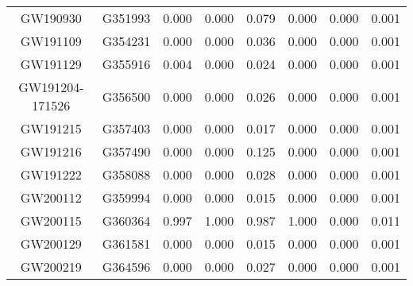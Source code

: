 \begin{table}[]
\begin{tabular}{c|c|ccr|ccr}
GW190930                      & G351993               & 0.000                   & 0.000                    & 0.079                   & 0.000                   & 0.000                    & 0.001                   \\
GW191109                      & G354231               & 0.000                   & 0.000                    & 0.036                   & 0.000                   & 0.000                    & 0.001                   \\
GW191129                      & G355916               & 0.004                   & 0.000                    & 0.024                   & 0.000                   & 0.000                    & 0.001                   \\
GW191204-171526               & G356500               & 0.000                   & 0.000                    & 0.026                   & 0.000                   & 0.000                    & 0.001                   \\
GW191215                      & G357403               & 0.000                   & 0.000                    & 0.017                   & 0.000                   & 0.000                    & 0.001                   \\
GW191216                      & G357490               & 0.000                   & 0.000                    & 0.125                   & 0.000                   & 0.000                    & 0.001                   \\
GW191222                      & G358088               & 0.000                   & 0.000                    & 0.028                   & 0.000                   & 0.000                    & 0.001                   \\
GW200112                      & G359994               & 0.000                   & 0.000                    & 0.015                   & 0.000                   & 0.000                    & 0.001                   \\
GW200115                      & G360364               & 0.997                   & 1.000                    & 0.987                   & 1.000                   & 0.000                    & 0.011                   \\
GW200129                      & G361581               & 0.000                   & 0.000                    & 0.015                   & 0.000                   & 0.000                    & 0.001                   \\
GW200219                      & G364596               & 0.000                   & 0.000                    & 0.027                   & 0.000                   & 0.000                    & 0.001                   \\

\end{tabular}
\end{table}
